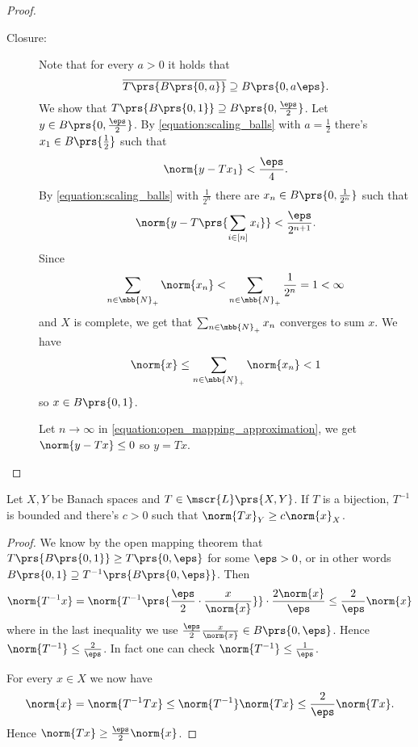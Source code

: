 \documentclass[10pt, twoside]{book}
\begin{document}
\begin{proof}
\begin{description}
\item[Closure:]
Note that for every $a > 0$ it holds that
\begin{equation} \label{equation:scaling_balls}
\overline{T\prs{B\prs{0,a}}} \supseteq B\prs{0,a \eps} \text{.}
\end{equation}
We show that $T\prs{B\prs{0,1}} \supseteq B\prs{0,\frac{\eps}{2}}$.
Let $y \in B\prs{0, \frac{\eps}{2}}$. By \eqref{equation:scaling_balls} with $a = \frac{1}{2}$ there's $x_1 \in B\prs{\frac{1}{2}}$ such that
\[\norm{y - Tx_1} < \frac{\eps}{4} \text{.}\]
By \eqref{equation:scaling_balls} with $\frac{1}{2^n}$ there are $x_n \in B\prs{0, \frac{1}{2^n}}$ such that
\begin{equation}\label{equation:open_mapping_approximation}
\norm{y - T\prs{\sum_{i\in[n]} x_i}} < \frac{\eps}{2^{n+1}} \text{.}
\end{equation}
Since \[\sum_{n \in \mbb{N}_+} \norm{x_n} < \sum_{n \in \mbb{N}_+} \frac{1}{2^n} = 1 < \infty\]
and $X$ is complete, we get that
$\sum_{n \in \mbb{N}_+} x_n$ converges to sum $x$.
We have
\[\norm{x} \leq \sum_{n \in \mbb{N}_+} \norm{x_n} < 1\]
so $x \in B\prs{0,1}$.

Let $n \to \infty$ in \eqref{equation:open_mapping_approximation}, we get $\norm{y - Tx} \leq 0$ so $y = Tx$.
\end{description}
\end{proof}

\begin{corollary}\label{corollary:bounded_inverse}
Let $X,Y$ be Banach spaces and $T \in \mscr{L}\prs{X,Y}$. If $T$ is a bijection, $T^{-1}$ is bounded and there's $c > 0$ such that $\norm{Tx}_Y \geq c \norm{x}_X$.
\end{corollary}

\begin{proof}
We know by the open mapping theorem that $T\prs{B\prs{0,1}} \geq T\prs{0,\eps}$ for some $\eps > 0$, or in other words $B\prs{0,1} \supseteq T^{-1}\prs{B\prs{0,\eps}}$. Then
\begin{align*}
\norm{T^{-1} x} = \norm{T^{-1}\prs{\frac{\eps}{2} \cdot \frac{x}{\norm{x}}}} \cdot \frac{2 \norm{x}}{\eps} \leq \frac{2}{\eps} \norm{x}
\end{align*}
where in the last inequality we use $\frac{\eps}{2} \frac{x}{\norm{x}} \in B\prs{0,\eps}$.
Hence
$\norm{T^{-1}} \leq \frac{2}{\eps}$. In fact one can check $\norm{T^{-1}} \leq \frac{1}{\eps}$.

For every $x \in X$ we now have
\[\norm{x} = \norm{T^{-1} T x} \leq \norm{T^{-1}} \norm{Tx} \leq \frac{2}{\eps} \norm{Tx} \text{.}\]
Hence $\norm{Tx} \geq \frac{\eps}{2} \norm{x}$.
\end{proof}
\end{document}
